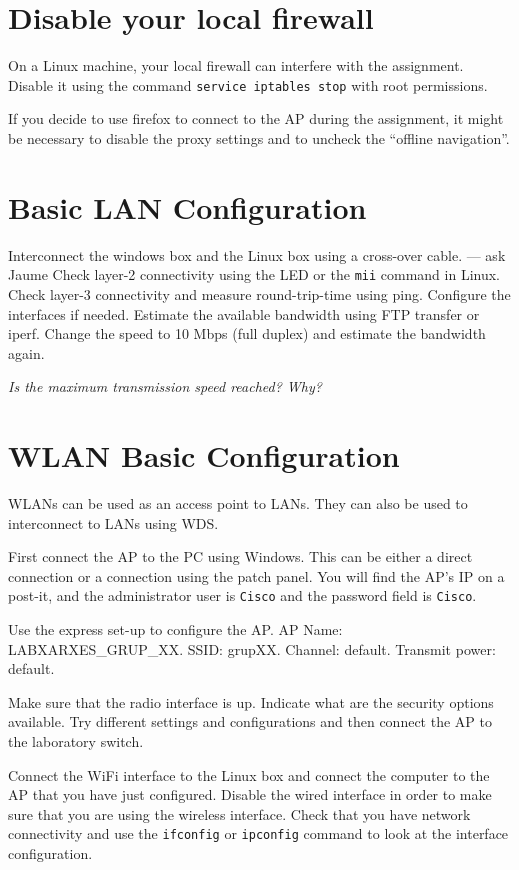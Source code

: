 \section{Disable your local firewall}

On a Linux machine, your local firewall can interfere with the assignment.
Disable it using the command \texttt{service iptables stop} with root permissions.

If you decide to use firefox to connect to the AP during the assignment, it might be necessary to disable the proxy settings and to uncheck the ``offline navigation''.

\section{Basic LAN Configuration}

Interconnect the windows box and the Linux box using a cross-over cable. --- ask Jaume
Check layer-2 connectivity using the LED or the \texttt{mii} command in Linux.
Check layer-3 connectivity and measure round-trip-time using ping.
Configure the interfaces if needed.
Estimate the available bandwidth using FTP transfer or iperf.
Change the speed to 10 Mbps (full duplex) and estimate the bandwidth again.

\emph{Is the maximum transmission speed reached? Why?}

\section{WLAN Basic Configuration}

WLANs can be used as an access point to LANs.
They can also be used to interconnect to LANs using WDS.

First connect the AP to the PC using Windows.
This can be either a direct connection or a connection using the patch panel.
You will find the AP's IP on a post-it, and the administrator user is \texttt{Cisco} and the password field is \texttt{Cisco}.

Use the express set-up to configure the AP.
AP Name: LABXARXES\_GRUP\_XX.
SSID: grupXX.
Channel: default.
Transmit power: default.

Make sure that the radio interface is up.
Indicate what are the security options available.
Try different settings and configurations and then connect the AP to the laboratory switch.

Connect the WiFi interface to the Linux box and connect the computer to the AP that you have just configured.
Disable the wired interface in order to make sure that you are using the wireless interface.
Check that you have network connectivity and use the \texttt{ifconfig} or \texttt{ipconfig} command to look at the interface configuration.

